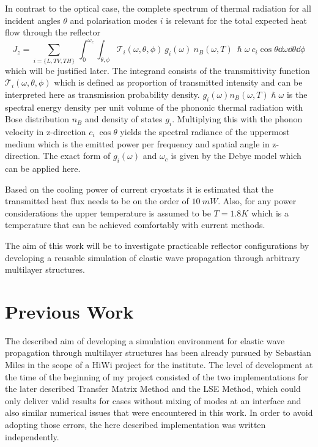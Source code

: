 In contrast to the optical case, the complete spectrum of thermal
radiation for all incident angles $\theta$ and polarisation modes $i$ is
relevant for the total expected heat flow through the reflector
\begin{equation} \label{eq:totalheatflow}
    J_z = \sum\limits_{i=\{L,TV,TH\}}\ \int_0^{\omega_c}\int_{\theta, \phi}
    \mathcal{T}_i(\omega, \theta, \phi)\ g_i(\omega)\ n_B(\omega, T)\
    \hslash \omega\  c_i\cos \theta \dd{\omega} \dd{\theta}\dd{\phi}
\end{equation}
which will be justified later. The integrand
consists of the transmittivity function $\mathcal{T}_i(\omega, \theta, \phi)$
which is defined as proportion of transmitted intensity and can be interpreted
here as transmission probability density. $g_i(\omega)
    n_B(\omega,T)\hslash\omega$ is the spectral energy density per unit volume
of the phononic thermal radiation with Bose distribution $n_B$ and density of
states $g_i$. Multiplying this with the phonon velocity in z-direction $c_i\
    \cos\theta$ yields the spectral radiance of the uppermost medium which is
the emitted power per frequency and spatial angle in z-direction. The exact
form of $g_i(\omega)$ and $\omega_c$ is given by the Debye model which can be
applied here.

Based on the cooling power of current cryostats it is estimated that the
transmitted heat flux needs to be on the order of $10\ \si{mW}$. Also,
for any power considerations the upper temperature is assumed to be
$T=1.8\si{K}$
which is a temperature that can be achieved comfortably with current methods.

The aim of this work will be to investigate practicable reflector
configurations by developing a reusable simulation of elastic wave propagation
through arbitrary multilayer structures.  %

\section{Previous Work}
The described aim of developing a simulation environment for elastic wave
propagation through multilayer structures has been already pursued by Sebastian
Miles in the scope of a HiWi project for the institute. The level of
development at the time of the beginning of my project consisted of the two
implementations for the later described Transfer Matrix Method and the LSE
Method, which could only deliver valid results for cases without mixing of
modes at an interface and also similar numerical issues that were encountered
in this work. In order to avoid adopting those errors, the here described
implementation was written independently.

